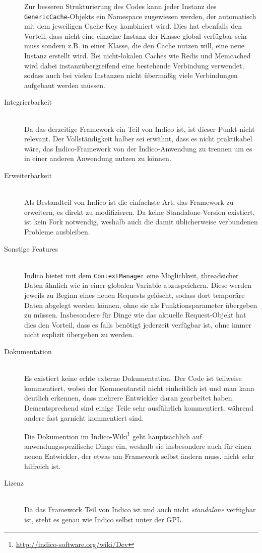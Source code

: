 \begin{description}
Zur besseren Strukturierung des Codes kann jeder Instanz des \lstinline{GenericCache}-Objekts ein
Namespace zugewiesen werden, der automatisch mit dem jeweiligen Cache-Key kombiniert wird. Dies hat
ebenfalls den Vorteil, dass nicht eine einzelne Instanz der Klasse global verfügbar sein muss
sondern z.B. in einer Klasse, die den Cache nutzen will, eine neue Instanz erstellt wird.
Bei nicht-lokalen Caches wie Redis und Memcached wird dabei instanzübergreifend eine bestehende
Verbindung verwendet, sodass auch bei vielen Instanzen nicht übermäßig viele Verbindungen aufgebaut
werden müssen.


\item[Integrierbarkeit] \hfill \\
Da das derzeitige Framework ein Teil von Indico ist, ist dieser Punkt nicht relevant. Der
Vollständigkeit halber sei erwähnt, dass es nicht praktikabel wäre, das Indico-Framework von der
Indico-Anwendung zu trennen um es in einer anderen Anwendung nutzen zu können.


\item[Erweiterbarkeit] \hfill \\
Als Bestandteil von Indico ist die einfachste Art, das Framework zu erweitern, es direkt zu
modifizieren. Da keine Standalone-Version existiert, ist kein Fork notwendig, weshalb auch die damit
üblicherweise verbundenen Probleme ausbleiben.


\item[Sonstige Features] \hfill \\
Indico bietet mit dem \lstinline{ContextManager} eine Möglichkeit, threadsicher Daten ähnlich wie in
einer globalen Variable abzuspeichern. Diese werden jeweils zu Beginn eines neuen Requests gelöscht,
sodass dort temporäre Daten abgelegt werden können, ohne sie als Funktionsparameter übergeben zu
müssen. Insbesondere für Dinge wie das aktuelle Request-Objekt hat dies den Vorteil, dass es falls
benötigt jederzeit verfügbar ist, ohne immer nicht explizit übergeben zu werden.


\item[Dokumentation] \hfill \\
Es existiert keine echte externe Dokumentation. Der Code ist teilweise kommentiert, wobei der
Kommentarstil nicht einheitlich ist und man kann deutlich erkennen, dass mehrere Entwickler daran
gearbeitet haben. Dementsprechend sind einige Teile sehr ausführlich kommentiert, während andere
fast garnicht kommentiert sind.

Die Dokumention im Indico-Wiki\footnote{\href{http://indico-software.org/wiki/Dev}{http://indico-software.org/wiki/Dev}}
geht hauptsächlich auf anwendungsspezifische Dinge ein, weshalb sie insbesondere auch für einen
neuen Entwickler, der etwas am Framework selbst ändern muss, nicht sehr hilfreich ist.


\item[Lizenz] \hfill \\
Da das Framework Teil von Indico ist und auch nicht \emph{standalone} verfügbar ist, steht es genau
wie Indico selbst unter der GPL.

\end{description}

